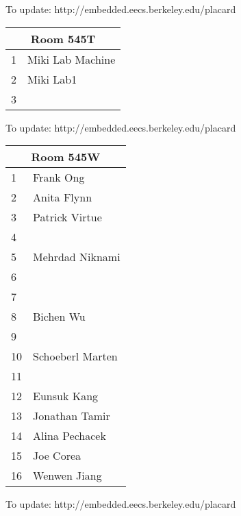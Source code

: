 \documentclass{article}
\begin{document}
{\scriptsize To update: http://embedded.eecs.berkeley.edu/placard}
\vspace{1in}

\noindent
\begin{tabular}{|l|l|}
\hline
\multicolumn{2}{|c|}{Room 545T} \\ \hline\hline
1&Miki Lab Machine\\
2&Miki Lab1\\
3& \\

\hline
\end{tabular}

{\scriptsize To update: http://embedded.eecs.berkeley.edu/placard}
\vspace{1in}

\noindent
\begin{tabular}{|l|l|}
\hline
\multicolumn{2}{|c|}{Room 545W} \\ \hline\hline
1&Frank Ong\\
2&Anita Flynn\\
3&Patrick Virtue\\
4& \\
5&Mehrdad Niknami\\
6& \\
7& \\
8&Bichen Wu\\
9& \\
10&Schoeberl Marten\\
11& \\
12&Eunsuk Kang\\
13&Jonathan Tamir\\
14&Alina Pechacek\\
15&Joe Corea\\
16&Wenwen Jiang\\

\hline
\end{tabular}

{\scriptsize To update: http://embedded.eecs.berkeley.edu/placard}
\end{document}

